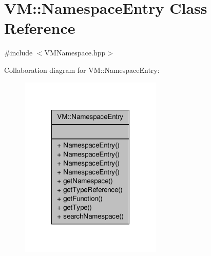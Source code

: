 \hypertarget{class_v_m_1_1_namespace_entry}{\section{V\-M\-:\-:Namespace\-Entry Class Reference}
\label{class_v_m_1_1_namespace_entry}
}


{\ttfamily \#include $<$V\-M\-Namespace.\-hpp$>$}



Collaboration diagram for V\-M\-:\-:Namespace\-Entry\-:
\nopagebreak
\begin{figure}[H]
\begin{center}
\leavevmode
\includegraphics[width=192pt]{class_v_m_1_1_namespace_entry__coll__graph}
\end{center}
\end{figure}
